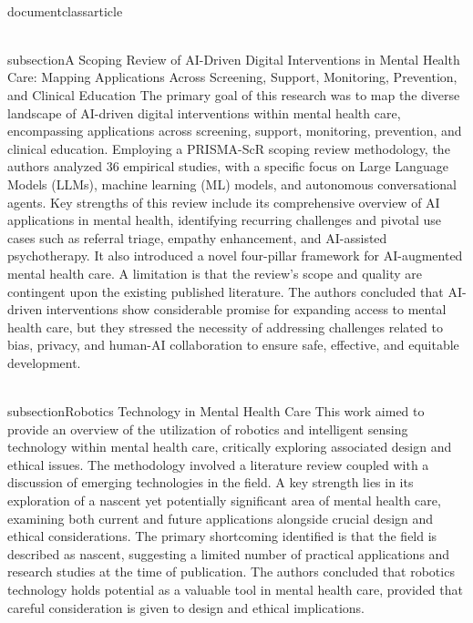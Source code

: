 \\documentclass{article}
\begin{document}
\\subsection{A Scoping Review of AI-Driven Digital Interventions in Mental Health Care: Mapping Applications Across Screening, Support, Monitoring, Prevention, and Clinical Education}
The primary goal of this research was to map the diverse landscape of AI-driven digital interventions within mental health care, encompassing applications across screening, support, monitoring, prevention, and clinical education. Employing a PRISMA-ScR scoping review methodology, the authors analyzed 36 empirical studies, with a specific focus on Large Language Models (LLMs), machine learning (ML) models, and autonomous conversational agents. Key strengths of this review include its comprehensive overview of AI applications in mental health, identifying recurring challenges and pivotal use cases such as referral triage, empathy enhancement, and AI-assisted psychotherapy. It also introduced a novel four-pillar framework for AI-augmented mental health care. A limitation is that the review's scope and quality are contingent upon the existing published literature. The authors concluded that AI-driven interventions show considerable promise for expanding access to mental health care, but they stressed the necessity of addressing challenges related to bias, privacy, and human-AI collaboration to ensure safe, effective, and equitable development.

\\subsection{Robotics Technology in Mental Health Care}
This work aimed to provide an overview of the utilization of robotics and intelligent sensing technology within mental health care, critically exploring associated design and ethical issues. The methodology involved a literature review coupled with a discussion of emerging technologies in the field. A key strength lies in its exploration of a nascent yet potentially significant area of mental health care, examining both current and future applications alongside crucial design and ethical considerations. The primary shortcoming identified is that the field is described as nascent, suggesting a limited number of practical applications and research studies at the time of publication. The authors concluded that robotics technology holds potential as a valuable tool in mental health care, provided that careful consideration is given to design and ethical implications.
\end{document}
